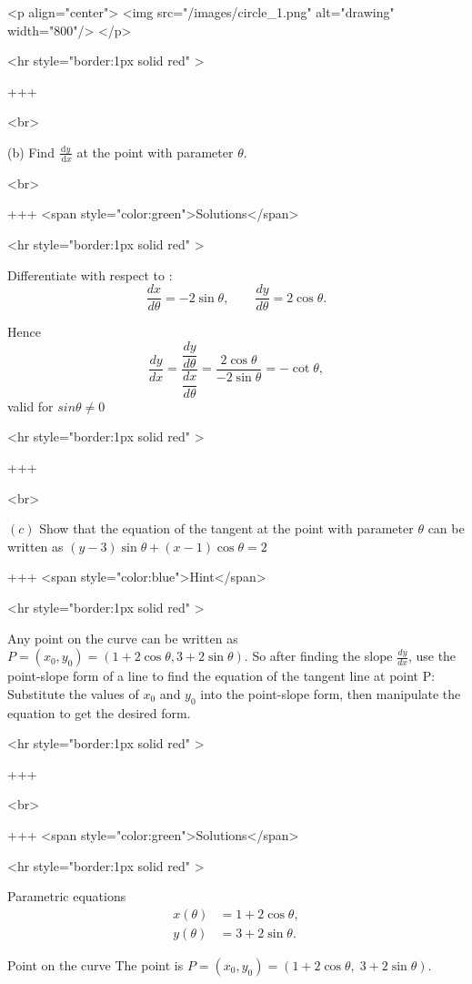 <p align="center">
<img src="/images/circle_1.png" alt="drawing" width="800"/>
</p>

<hr style="border:1px solid red" >

+++

<br>


(b) Find $\frac{\mathrm{d} y}{\mathrm{~d} x}$ at the point with parameter $\theta$.

<br>

+++ <span style="color:green">Solutions</span>

<hr style="border:1px solid red" >

Differentiate with respect to \theta:
$$
\frac{dx}{d\theta} = -2\sin\theta,\qquad \frac{dy}{d\theta} = 2\cos\theta.
$$

Hence
$$
\frac{dy}{dx}=\frac{\dfrac{dy}{d\theta}}{\dfrac{dx}{d\theta}}=\frac{2\cos\theta}{-2\sin\theta}=-\cot\theta,
$$
valid for $sinθ \neq 0$

<hr style="border:1px solid red" >

+++

<br>

\((c)\) Show that the equation of the tangent at the point with parameter $\theta$ can be written as $(y-3) \sin \theta+(x-1) \cos \theta=2$

+++ <span style="color:blue">Hint</span>

<hr style="border:1px solid red" >

Any point on the curve can be written as \( P=(x_0,y_0)=(1+2\cos\theta, 3+2\sin\theta) \). So after finding the slope \( \frac{dy}{dx} \), use the point-slope form of a line to find the equation of the tangent line at point P:
Substitute the values of \( x_0 \) and \( y_0 \) into the point-slope form, then manipulate the equation to get the desired form.

<hr style="border:1px solid red" >

+++

<br>

+++ <span style="color:green">Solutions</span>

<hr style="border:1px solid red" >

Parametric equations
\begin{align*}
x(\theta) &= 1 + 2\cos\theta,\\
y(\theta) &= 3 + 2\sin\theta.
\end{align*}

Point on the curve
The point is $P=(x_0,y_0)=(1+2\cos\theta,\;3+2\sin\theta)$.

